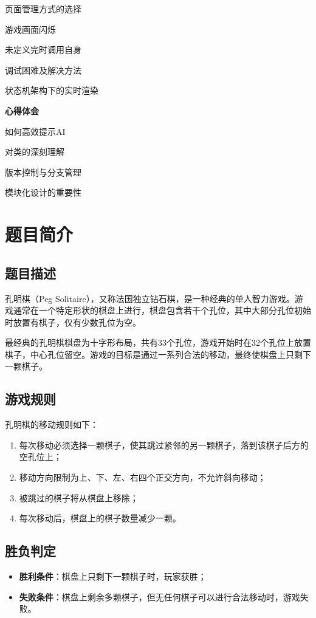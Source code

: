 \documentclass[12pt, a4paper]{article}
\begin{document}
\begin{mytoc}
\begin{mytoc}
        \item 页面管理方式的选择
        \item 游戏画面闪烁
        \item 未定义完时调用自身
        \item 调试困难及解决方法
        \item 状态机架构下的实时渲染
    \end{mytoc}
    \item {\bfseries\color{academicblue} 心得体会}
    \begin{mytoc}
        \item 如何高效提示AI
        \item 对类的深刻理解
        \item 版本控制与分支管理
        \item 模块化设计的重要性
    \end{mytoc}
\end{mytoc}

\newpage
\section{题目简介}

\subsection{题目描述}
孔明棋（Peg Solitaire），又称法国独立钻石棋，是一种经典的单人智力游戏。游戏通常在一个特定形状的棋盘上进行，棋盘包含若干个孔位，其中大部分孔位初始时放置有棋子，仅有少数孔位为空。

最经典的孔明棋棋盘为十字形布局，共有33个孔位，游戏开始时在32个孔位上放置棋子，中心孔位留空。游戏的目标是通过一系列合法的移动，最终使棋盘上只剩下一颗棋子。

\subsection{游戏规则}
孔明棋的移动规则如下：
\begin{enumerate}
  \item 每次移动必须选择一颗棋子，使其跳过紧邻的另一颗棋子，落到该棋子后方的空孔位上；
  \item 移动方向限制为上、下、左、右四个正交方向，不允许斜向移动；
  \item 被跳过的棋子将从棋盘上移除；
  \item 每次移动后，棋盘上的棋子数量减少一颗。
\end{enumerate}

\subsection{胜负判定}
\begin{itemize}
  \item \textbf{胜利条件}：棋盘上只剩下一颗棋子时，玩家获胜；
  \item \textbf{失败条件}：棋盘上剩余多颗棋子，但无任何棋子可以进行合法移动时，游戏失败。
\end{itemize}
\end{document}
